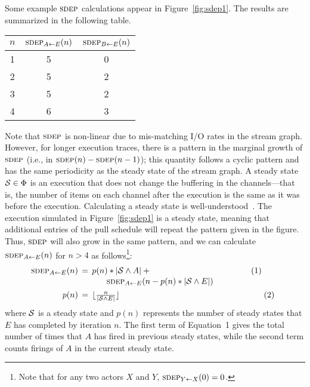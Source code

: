 Some example $\textsc{sdep}$ calculations appear in Figure~\ref{fig:sdep1}.
The results are summarized in the following table.
\begin{center}
\begin{tabular}{|c|c|c|}
\hline
$n$ & $\textsc{sdep}_{A \small{\leftarrow} E}(n)$ & $\textsc{sdep}_{B \small{\leftarrow} E}(n)$ \\
\hline \hline
1 & 5 & 0 \\ \hline
2 & 5 & 2 \\ \hline
3 & 5 & 2 \\ \hline
4 & 6 & 3 \\ \hline
\end{tabular}
\end{center}
Note that $\textsc{sdep}$ is non-linear due to mis-matching I/O rates in the
stream graph.  However, for longer execution traces, there is a
pattern in the marginal growth of $\textsc{sdep}$ (i.e., in $\textsc{sdep}(n) -
\textsc{sdep}(n-1)$); this quantity follows a cyclic pattern and has the same
periodicity as the steady state of the stream graph.  A steady state
${\cal S} \in \Phi$ is an execution that does not change the buffering
in the channels---that is, the number of items on each channel after
the execution is the same as it was before the execution.  Calculating
a steady state is well-understood~\cite{lee_static_1987}.  The execution
simulated in Figure~\ref{fig:sdep1} is a steady state, meaning that
additional entries of the pull schedule will repeat the pattern given
in the figure.  Thus, $\textsc{sdep}$ will also grow in the same pattern, and
we can calculate $\textsc{sdep}_{A \small{\leftarrow} E}(n)$ for $n > 4$ as
follows\footnote{Note that for any two actors $X$ and $Y$,
$\textsc{sdep}_{Y \small{\leftarrow} X}(0) = 0$.}:
\begin{equation}
\label{eq:sdep-steady}
\nonumber
\hspace{-4.5pt}\begin{array}{rcl}
\sdepf{A}{E}(n) \hspace{-5.5pt}&=&\hspace{-5.5pt} p(n) * |{\cal S} \wedge A| + ~~~~~~~~~~~~~~~~~~~~~~~~~~~~~\hspace{16.3pt}~~(1)\\[0.2Ex]
~&~&\mbox{~}\hspace{8.5pt} \sdepf{A}{E}(n - p(n) * |{\cal S} \wedge E|) \\[1Ex]
p(n) \hspace{-5.5pt}&=&\hspace{-5.5pt} \lfloor \frac{n}{|{\cal S} \wedge E|} \rfloor~~~~~~~~~~~~~~~~~~~~~~~~~~~~~~~~~~~~~\hspace{20pt}~~~~~~~~~(2) %
\end{array}
\end{equation}
where ${\cal S}$ is a steady state and $p(n)$ represents the number of
steady states that $E$ has completed by iteration $n$.  The first term
of Equation~1 gives the total number of times that $A$ has fired in
previous steady states, while the second term counts firings of $A$ in
the current steady state.

